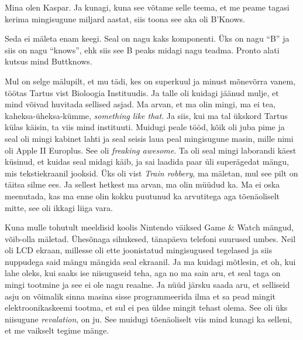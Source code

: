 

Mina olen Kaspar. Ja kunagi, kuna see võtame selle teema, et me peame tagasi kerima mingisugune miljard aastat, siis toona see aka oli B'Knows. 


Seda ei mäleta enam keegi. Seal on nagu kaks komponenti. Üks on nagu \enquote{B} ja siis on nagu \enquote{knows}, ehk siis see B peaks  midagi nagu teadma. Pronto alati kutsus mind Buttknows.


Mul on selge mälupilt, et mu tädi, kes on superkuul ja minust mõnevõrra vanem, töötas Tartus
vist Bioloogia Instituudis. Ja  talle oli kuidagi jäänud mulje, et mind võivad huvitada sellised asjad. Ma arvan, et ma olin mingi, ma ei tea, kaheksa-üheksa-kümme, \emph{something like that}. Ja siis, kui ma tal ükskord Tartus külas käisin, ta viis mind instituuti. Muidugi peale tööd, kõik oli juba pime ja  seal oli mingi kabinet lahti ja seal seisis laua peal mingisugune masin, mille nimi oli Apple II Europlus. See oli \emph{freaking awesome}. Ta oli seal mingi laborandi käest küsinud, et kuidas seal midagi käib, ja sai laadida paar üli superägedat mängu, mis tekstiekraanil jooksid. Üks oli vist \emph{Train robbery}, ma mäletan, mul see pilt on täitsa silme ees. Ja sellest hetkest ma arvan, ma olin müüdud ka. Ma ei oska  meenutada, kas ma enne olin kokku puutunud ka arvutitega aga tõenäoliselt mitte, see oli ikkagi liiga  vara. 

Kuna mulle tohutult meeldisid koolis Nintendo väiksed Game \& Watch mängud, võib-olla mäletad. Ühesõnaga sihukesed, tänapäeva telefoni suurused umbes. Neil oli LCD ekraan, millesse oli ette joonistatud mingisugused tegelased ja siis nuppudega said mängu mängida seal ekraanil. Ja  ma kuidagi mõtlesin, et oh, kui lahe oleks, kui saaks ise niisuguseid teha, aga no ma sain aru, et seal taga on mingi tootmine ja see ei ole nagu reaalne. Ja nüüd järsku saada aru, et selliseid asju on võimalik sinna masina sisse programmeerida ilma  et sa pead mingit elektroonikaskeemi tootma, et sul ei pea üldse mingit tehast olema. See oli üks niisugune \emph{revalation}, on ju. See muidugi  tõenäoliselt viis mind kunagi ka selleni, et me vaikselt tegime mänge. 


